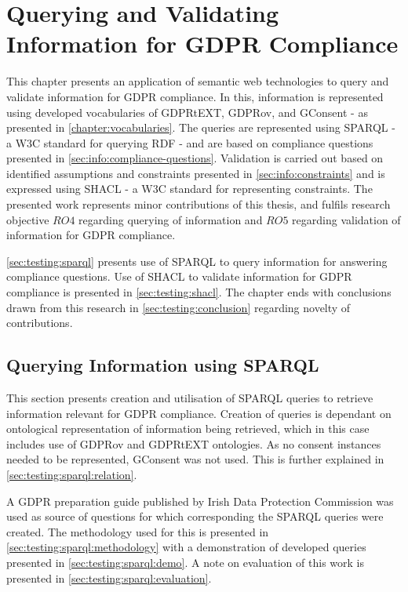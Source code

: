 \chapter{Querying and Validating Information for GDPR Compliance}
\label{chapter:testing}
This chapter presents an application of semantic web technologies to query and validate information for GDPR compliance.
In this, information is represented using developed vocabularies of GDPRtEXT, GDPRov, and GConsent - as presented in \autoref{chapter:vocabularies}.
The queries are represented using SPARQL - a W3C standard for querying RDF - and are based on compliance questions presented in \autoref{sec:info:compliance-questions}.
Validation is carried out based on identified assumptions and constraints presented in \autoref{sec:info:constraints} and is expressed using SHACL - a W3C standard for representing constraints.
The presented work represents minor contributions of this thesis, and fulfils research objective $RO4$ regarding querying of information and $RO5$ regarding validation of information for GDPR compliance.

\autoref{sec:testing:sparql} presents use of SPARQL to query information for answering compliance questions.
Use of SHACL to validate information for GDPR compliance is presented in \autoref{sec:testing:shacl}.
The chapter ends with conclusions drawn from this research in \autoref{sec:testing:conclusion} regarding novelty of contributions.

\section{Querying Information using SPARQL}\label{sec:testing:sparql}
This section presents creation and utilisation of SPARQL queries to retrieve information relevant for GDPR compliance.
Creation of queries is dependant on ontological representation of information being retrieved, which in this case includes use of GDPRov and GDPRtEXT ontologies.
As no consent instances needed to be represented, GConsent was not used.
This is further explained in \autoref{sec:testing:sparql:relation}.

A GDPR preparation guide published by Irish Data Protection Commission was used as source of questions for which corresponding the SPARQL queries were created. The methodology used for this is presented in \autoref{sec:testing:sparql:methodology} with a demonstration of developed queries presented in \autoref{sec:testing:sparql:demo}.
A note on evaluation of this work is presented in \autoref{sec:testing:sparql:evaluation}.

